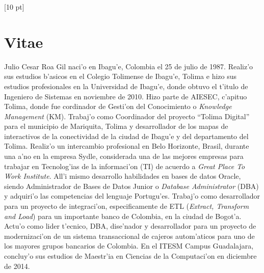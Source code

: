 \titleformat{\chapter}{\Huge\bfseries}{\thechapter}{0 pt}{\rule{340 pt}{3 pt}\\}
\titlespacing{\chapter}{100 pt}{-25 pt}{40 pt}[10 pt]	
\pagestyle{fancy}
\fancyhead[RO,RE]{\thepage}
\fancyfoot[CO,CE]{}

\chapter*{Vitae}

\normalsize
\noindent
Julio Cesar Roa Gil naci'o en Ibagu'e, Colombia el 25 de julio de 1987. Realiz'o sus estudios b'asicos en el Colegio Tolimense de Ibagu'e, Tolima e hizo sus estudios profesionales en la Universidad de Ibagu'e, donde obtuvo el t'itulo de Ingeniero de Sistemas en noviembre de 2010. Hizo parte de AIESEC, c'apituo Tolima, donde fue cordinador de Gesti'on del Conocimiento o \emph{Knowledge Management} (KM). Trabaj'o como Coordinador del proyecto ``Tolima Digital'' para el municipio de Mariquita, Tolima y desarrollador de los mapas de interactivos de la conectividad de la ciudad de Ibagu'e y del departamento del Tolima. Realiz'o un intercambio profesional en Belo Horizonte, Brasil, durante una a'no en la empresa Sydle, considerada una de las mejores empresas para trabajar en Tecnolog'ias de la informaci'on (TI) de acuerdo a \emph{Great Place To Work Institute}. All'i mismo desarrollo habilidades en bases de datos Oracle, siendo Administrador de Bases de Datos Junior o \emph{Database Administrator} (DBA) y adquiri'o las competencias del lenguaje Portugu'es. Trabaj'o como desarrollador para un proyecto de integraci'on, especificamente de ETL (\emph{Extract, Transform and Load}) para un importante banco de Colombia, en la ciudad de Bogot'a. Actu'o como lider t'ecnico, DBA, dise'nador y desarrollador para un proyecto de modernizaci'on de un sistema transaccional de cajeros autom'aticos para uno de los mayores grupos bancarios de Colombia. En el ITESM Campus Guadalajara, concluy'o sus estudios de Maestr'ia en Ciencias de la Computaci'on en diciembre de 2014.